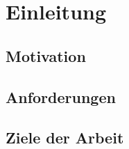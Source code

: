 \chapter{Einleitung}

\section{Motivation}

\section{Anforderungen}

\section{Ziele der Arbeit}
\label{ziele}
